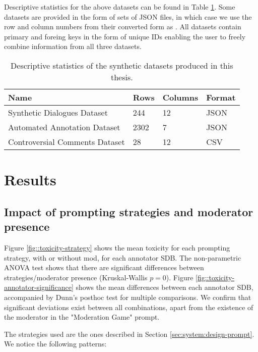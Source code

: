 Descriptive statistics for the above datasets can be found in Table \ref{tab:datasets}. Some datasets are provided in the form of sets of JSON files, in which case we use the row and column numbers from their converted form as . All datasets contain primary and foreing keys in the form of unique IDs enabling the user to freely combine information from all three datasets.


\begin{table}
	\begin{tabular}
		{ |p{6cm}|p{1cm}|p{1.5cm}|p{2cm}|}
		\hline
		\cellcolor{blue!25}\textbf{Name} & \cellcolor{blue!25}\textbf{Rows} & \cellcolor{blue!25}\textbf{Columns} & \cellcolor{blue!25}\textbf{Format}\\
		\hline
		Synthetic Dialogues Dataset & 244 & 12 & JSON\\
		\hline
		Automated Annotation Dataset & 2302 & 7 & JSON\\
		\hline
		Controversial Comments Dataset & 28 & 12 & CSV\\
		\hline
	\end{tabular}
	\caption{Descriptive statistics of the synthetic datasets produced in this thesis.}
	\label{tab:datasets}
\end{table}



\section{Results}
\label{sec:evaluation:analysis}

\subsection{Impact of prompting strategies and moderator presence}
\label{ssec:evaluation:users}

Figure \ref{fig::toxicity-strategy} shows the mean toxicity for each prompting strategy, with or without mod, for each annotator SDB. The non-parametric ANOVA test shows that there are significant differences between strategies/moderator presence (Kruskal-Wallis $p=0$). Figure \ref{fig::toxicity-annotator-significance} shows the mean differences between each annotator SDB, accompanied by Dunn's posthoc test for multiple comparisons. We confirm that significant deviations exist between all combinations, apart from the existence of the moderator in the "Moderation Game" prompt.

The strategies used are the ones described in Section \ref{sec:system:design-prompt}. We notice the following patterns:

